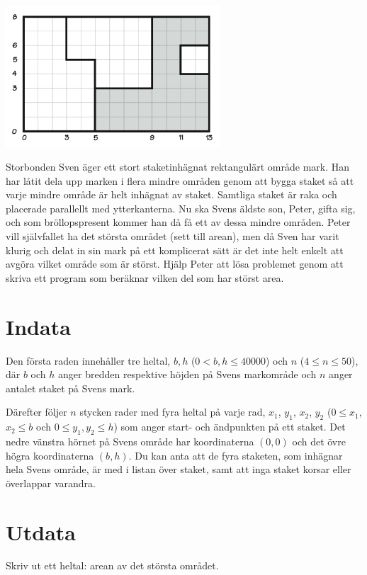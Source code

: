 

\begin{center}
\includegraphics[width=0.6\textwidth]{markant.png}
\end{center}

Storbonden Sven äger ett stort staketinhägnat rektangulärt område mark. Han har låtit dela upp marken i flera mindre områden genom att bygga staket så att varje mindre område är helt inhägnat av staket. Samtliga staket är raka och placerade parallellt med ytterkanterna. Nu ska Svens äldste son, Peter, gifta sig, och som bröllopspresent kommer han då få ett av dessa mindre områden. Peter vill självfallet ha det största området (sett till arean), men då Sven har varit klurig och delat in sin mark på ett komplicerat sätt är det inte helt enkelt att avgöra vilket område som är störst. Hjälp Peter att lösa problemet genom att skriva ett program som beräknar vilken del som har störst area.



\section*{Indata}
Den första raden innehåller tre heltal, $b, h$ ($0 < b, h \le 40000$) och $n$ ($4 \le n \le 50$),
där $b$ och $h$ anger bredden respektive höjden på Svens markområde och $n$ anger antalet staket på Svens mark.

Därefter följer $n$ stycken rader med fyra heltal på varje rad, $x_1$, $y_1$, $x_2$, $y_2$
($0 \le x_1$, $x_2 \le b$ och $0 \le y_1, y_2 \le h$) som anger start- och ändpunkten på ett staket.
Det nedre vänstra hörnet på Svens område har koordinaterna $(0, 0)$ och det övre högra koordinaterna $(b, h)$.
Du kan anta att de fyra staketen, som inhägnar hela Svens område, är med i listan över staket,
samt att inga staket korsar eller överlappar varandra.

\section*{Utdata}
Skriv ut ett heltal: arean av det största området.
